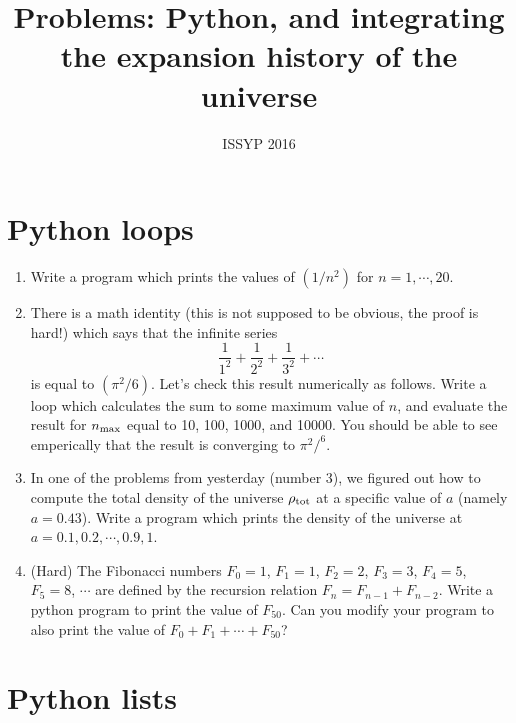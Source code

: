 \documentclass[aps,prd,superscriptaddress,groupedaddress,nofootinbib,nobibnotes]{revtex4}
\newcommand{\be}{\begin{equation}}
\newcommand{\ee}{\end{equation}}
\begin{document}
\title{Problems: Python, and integrating the expansion history of the universe}

\author{ISSYP 2016}


\maketitle

\section{Python loops}

\begin{enumerate}

\item Write a program which prints the values of $(1/n^2)$ for $n=1,\cdots,20$.

\item There is a math identity (this is not supposed to be obvious, the proof is hard!) which says
that the infinite series
\be
\frac{1}{1^2} + \frac{1}{2^2} + \frac{1}{3^2} + \cdots
\ee
is equal to $(\pi^2/6)$.  Let's check this result numerically as follows.  Write a loop which calculates the sum to some
maximum value of $n$, and evaluate the result for $n_{\rm max}$ equal to 10, 100, 1000, and 10000.
You should be able to see emperically that the result is converging to $\pi^2/^6$.

\item In one of the problems from yesterday (number 3), we figured out how to compute the total density of the universe
$\rho_{\rm tot}$ at a specific value of $a$ (namely $a=0.43$).  Write a program which prints the density of the universe
at $a = 0.1, 0.2, \cdots, 0.9, 1$.

\item (Hard) The Fibonacci numbers $F_0=1$, $F_1=1$, $F_2=2$, $F_3=3$, $F_4=5$, $F_5=8$, $\cdots$
  are defined by the recursion relation $F_n = F_{n-1} + F_{n-2}$.  Write a python program to print the value of $F_{50}$.
  Can you modify your program to also print the value of $F_0 + F_1 + \cdots + F_{50}$?

\end{enumerate}

\section{Python lists}
\end{document}
